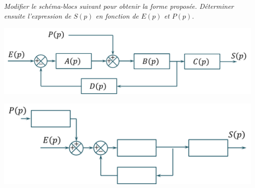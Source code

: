 \documentclass[10pt,fleqn]{article} %
\begin{document}
\begin{multicols}{2}
\subparagraph*{}
\textit{Modifier le schéma-blocs suivant pour obtenir la forme proposée. Déterminer ensuite l'expression de $S(p)$ en fonction de $E(p)$ et $P(p)$.}
\begin{center}
\includegraphics[scale=.2]{images/sb_04}
\end{center}

\begin{center}
\includegraphics[scale=.2]{images/sb_05}
\end{center}

\end{multicols}
\end{document}

